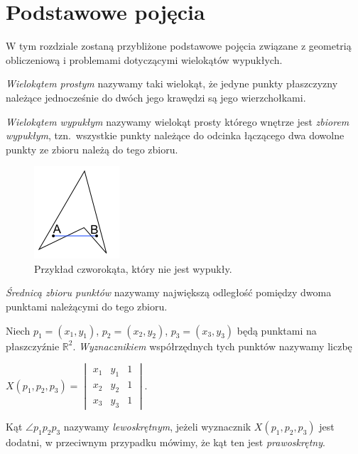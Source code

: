 \chapter{Podstawowe pojęcia}\label{chap:pojecia}
W tym rozdziale zostaną przybliżone podstawowe pojęcia związane
z geometrią obliczeniową i problemami dotyczącymi wielokątów
wypukłych.

\begin{definicja}
  \emph{Wielokątem prostym} nazywamy taki wielokąt, że jedyne punkty
  płaszczyzny należące jednocześnie do dwóch jego krawędzi są jego
  wierzchołkami.
\end{definicja}

\begin{definicja}
  \emph{Wielokątem wypukłym} nazywamy wielokąt prosty którego wnętrze
  jest \emph{zbiorem wypukłym}, tzn.\ wszystkie punkty należące do
  odcinka łączącego dwa dowolne punkty ze zbioru należą do tego
  zbioru.
\end{definicja}


\begin{figure}[htb]
  \centering
  \includegraphics{img/nonconvex}
  \caption{Przykład czworokąta, który nie jest wypukły.}
\end{figure}

\begin{definicja}
  \emph{Średnicą zbioru punktów} nazywamy największą odległość
  pomiędzy dwoma punktami należącymi do tego zbioru.
\end{definicja}

\begin{definicja}
  Niech $p_{1}=(x_{1},y_{1})$, $p_{2}=(x_{2},y_{2})$,
  $p_{3}=(x_{3},y_{3})$ będą punktami na płaszczyźnie
  $\mathbb{R}^2$. \emph{Wyznacznikiem} współrzędnych tych punktów
  nazywamy liczbę

  \begin{center}
    \begin{math}
      X(p_1, p_2, p_3) =
      \begin{vmatrix}
        x_1 & y_1 & 1 \\
        x_2 & y_2 & 1 \\
        x_3 & y_3 & 1
      \end{vmatrix}
      .
    \end{math}
  \end{center}

  Kąt $\angle p_{1}p_{2}p_{3}$ nazywamy \emph{lewoskrętnym}, jeżeli
  wyznacznik $X(p_1, p_2, p_3)$ jest dodatni, w przeciwnym przypadku
  mówimy, że kąt ten jest \emph{prawoskrętny}.
\end{definicja}

